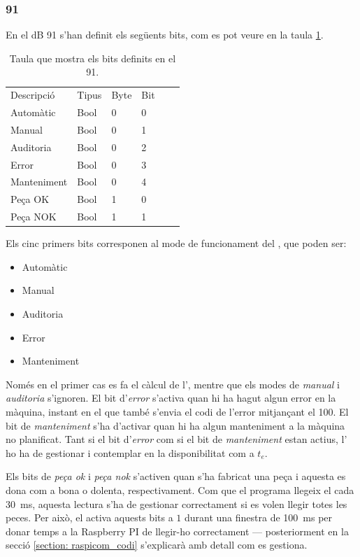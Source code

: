 \documentclass{tfgitic}[2022/06/30]
\begin{document}
\subsubsection{ 91}
\label{subsection:db91}
En el dB 91 s'han definit els següents bits, com es pot veure en la taula \ref{table:db91}.

\begin{table}[h]
\centering
\begin{tabular}{
>{\columncolor[HTML]{EBEAEA}}llllll}
\cellcolor[HTML]{D3D3D3} Descripció & \cellcolor[HTML]{D3D3D3} Tipus & \cellcolor[HTML]{D3D3D3} Byte &  \cellcolor[HTML]{D3D3D3} Bit \\
Automàtic & Bool & 0 & 0 \\
Manual & Bool & 0 & 1 \\
Auditoria & Bool & 0 & 2 \\
Error & Bool & 0 & 3 \\
Manteniment & Bool & 0 & 4 \\
Peça OK & Bool & 1 & 0 \\
Peça NOK & Bool & 1 & 1 \\
\end{tabular}
\label{table:db91}
\caption{Taula que mostra els bits definits en el  91.}
\end{table}

Els cinc primers bits corresponen al mode de funcionament del , que poden ser:

\begin{itemize}
    \item Automàtic
    \item Manual
    \item Auditoria
    \item Error
    \item Manteniment
\end{itemize}

Només en el primer cas es fa el càlcul de l', mentre que els modes de \emph{manual} i \emph{auditoria} s'ignoren. El bit d'\emph{error} s'activa quan hi ha hagut algun error en la màquina, instant en el que també s'envia el codi de l'error mitjançant el  100. El bit de \emph{manteniment} s'ha d'activar quan hi ha algun manteniment a la màquina no planificat. Tant si el bit d'\emph{error} com si el bit de \emph{manteniment} estan actius, l' ho ha de gestionar i contemplar en la disponibilitat com a $t_{e}$.

Els bits de \emph{peça ok} i \emph{peça nok} s'activen quan s'ha fabricat una peça i aquesta es dona com a bona o dolenta, respectivament. Com que el programa llegeix el  cada \SI{30}{ms}, aquesta lectura s'ha de gestionar correctament si es volen llegir totes les peces. Per això, el  activa aquests bits a $1$ durant una finestra de \SI{100}{ms} per donar temps a la Raspberry PI de llegir-ho correctament --- posteriorment en la secció \ref{section: raspicom_codi} s'explicarà amb detall com es gestiona.
\end{document}
